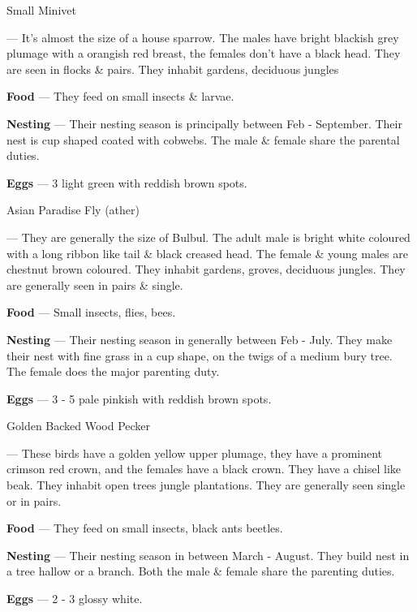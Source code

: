 \begin{bird}{Small Minivet}

 --- It's almost the size of a house sparrow. The males have bright blackish grey plumage with a orangish red breast, the females don't have a black head. They are seen in flocks \& pairs. They inhabit gardens, deciduous jungles

{\large\bf Food} --- They feed on small insects \& larvae.

{\large\bf Nesting} --- Their nesting season is principally between Feb - September. Their nest is cup shaped coated with cobwebs. The male \& female share the parental duties.

{\large\bf Eggs} --- 3 light green with reddish brown spots.
\end{bird}

\newpage

\begin{bird}{Asian Paradise Fly (ather)}

 --- They are generally the size of Bulbul. The adult male is bright white coloured with a long ribbon like tail \& black creased head. The female \& young males are chestnut brown coloured. They inhabit gardens, groves, deciduous jungles. They are generally seen in pairs \& single. 

{\large\bf Food} --- Small insects, flies, bees.

{\large\bf Nesting} --- Their nesting season in generally between Feb - July. They make their nest with fine grass in a cup shape, on the twigs of a medium bury tree. The female does the major parenting duty.

{\large\bf Eggs} --- 3 - 5 pale pinkish with reddish brown spots. 
\end{bird}

\begin{bird}{Golden Backed Wood Pecker}

 --- These birds have a golden yellow upper plumage, they have a prominent crimson red crown, and the females have a black crown. They have a chisel like beak. They inhabit open trees jungle plantations. They are generally seen single or in pairs.

{\large\bf Food} --- They feed on small insects, black ants beetles.

{\large\bf Nesting} --- Their nesting season in between March - August. They build nest in a tree hallow or a branch. Both the male \& female share the parenting duties.

{\large\bf Eggs} --- 2 - 3 glossy white.
\end{bird}


